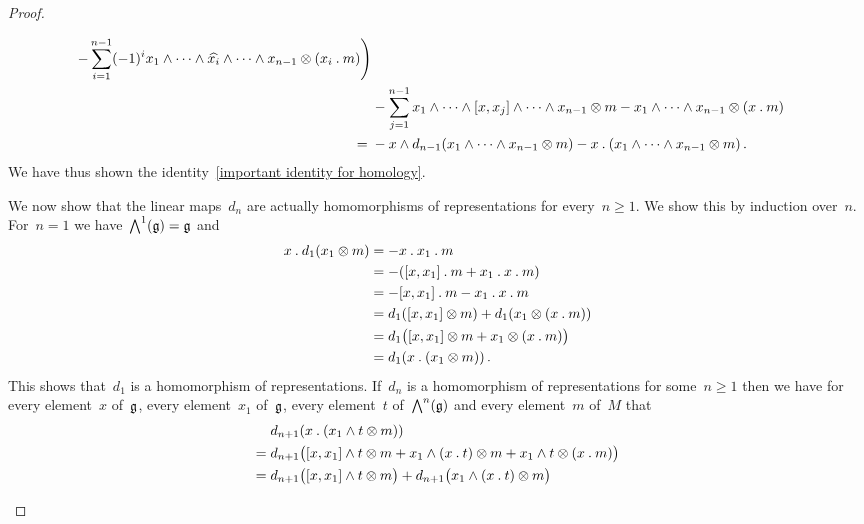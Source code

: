 \begin{proof}
\begin{enumerate}
\begin{align*}
        -
        \sum_{i=1}^{n-1}
        (-1)^i
        x_1 \wedge \dotsb \wedge \widehat{x_i} \wedge \dotsb \wedge x_{n-1} \otimes (x_i \mathbin{.} m)
        \Biggr)
        \\
        {}&
        -
        \sum_{j=1}^{n-1}
        x_1 \wedge \dotsb \wedge [x, x_j] \wedge \dotsb \wedge x_{n-1}
        \otimes m
        -
        x_1 \wedge \dotsb \wedge x_{n-1} \otimes (x \mathbin{.} m)
        \\
        ={}&
        - x \wedge d_{n-1}(x_1 \wedge \dotsb \wedge x_{n-1} \otimes m)
        - x \mathbin{.} (x_1 \wedge \dotsb \wedge x_{n-1} \otimes m) \,.
      \end{align*}
      We have thus shown the identity~\eqref{important identity for homology}.

      We now show that the linear maps~$d_n$ are actually homomorphisms of representations for every~$n \geq 1$.
      We show this by induction over~$n$.
      For~$n = 1$ we have~$\operatorname{\bigwedge}^1(\mathfrak{g}) = \mathfrak{g}$ and
      \begin{align*}
        x \mathbin{.} d_1(x_1 \otimes m)
        &=
        - x \mathbin{.} x_1 \mathbin{.} m
        \\
        &=
        - ( [x, x_1] \mathbin{.} m + x_1 \mathbin{.} x \mathbin{.} m )
        \\
        &=
        - [x, x_1] \mathbin{.} m - x_1 \mathbin{.} x \mathbin{.} m
        \\
        &=
        d_1( [x, x_1] \otimes m )
        + d_1( x_1 \otimes (x \mathbin{.} m) )
        \\
        &=
        d_1\bigl( [x, x_1] \otimes m + x_1 \otimes (x \mathbin{.} m) \bigr)
        \\
        &=
        d_1( x \mathbin{.} (x_1 \otimes m) ) \,.
      \end{align*}
      This shows that~$d_1$ is a homomorphism of representations.
      If~$d_n$ is a homomorphism of representations for some~$n \geq 1$ then we have for every element~$x$ of~$\mathfrak{g}$, every element~$x_1$ of~$\mathfrak{g}$, every element~$t$ of~$\operatorname{\bigwedge}^n(\mathfrak{g})$ and every element~$m$ of~$M$ that
      \begin{align*}
        {}&
        d_{n+1}( x \act (x_1 \wedge t \otimes m) )
        \\
        ={}&
        d_{n+1}
        \bigl(
          [x, x_1] \wedge t \otimes m
          + x_1 \wedge (x \act t) \otimes m
          + x_1 \wedge t \otimes (x \act m)
        \bigr)
        \\
        ={}&
        d_{n+1}\bigl( [x, x_1] \wedge t \otimes m \bigr)
        + d_{n+1}\bigl( x_1 \wedge (x \act t) \otimes m \bigr)

\end{align*}
\end{enumerate}
\end{proof}

